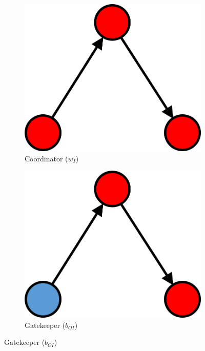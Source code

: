 \begin{figure}[hbt!]
\centering
  \begin{subfigure}[b]{0.25\textwidth}
    \includegraphics[width=\textwidth]{Images/w_I.png}
    \caption{Coordinator ($w_I$)}
    \label{fig:1}
  \end{subfigure}
  \hspace{2em}
  \begin{subfigure}[b]{0.25\textwidth}
    \includegraphics[width=\textwidth]{Images/b_OI.png}
    \caption{Gatekeeper ($b_{OI}$)}
    \label{fig:2}

\end{subfigure}
\end{figure}
